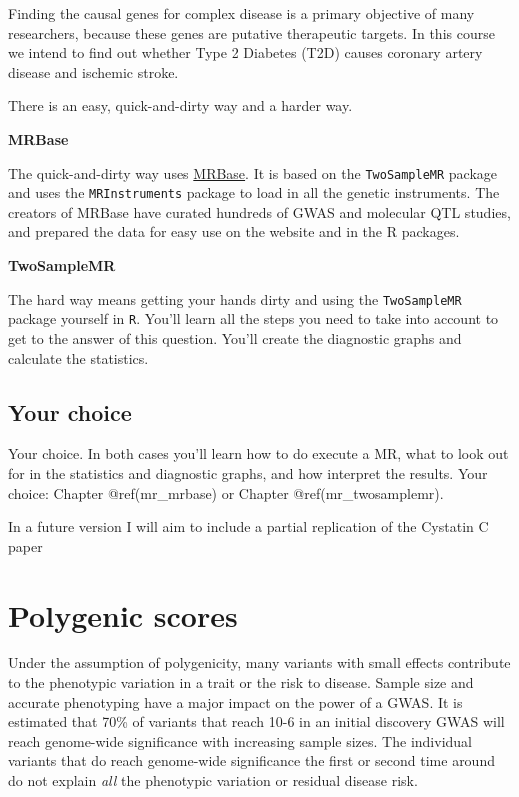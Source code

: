 \documentclass[
]{book}
\newcommand{\passthrough}[1]{#1}
\begin{document}
Finding the causal genes for complex disease is a primary objective of many researchers, because these genes are putative therapeutic targets. In this course we intend to find out whether Type 2 Diabetes (T2D) causes coronary artery disease and ischemic stroke.

There is an easy, quick-and-dirty way and a harder way.

\textbf{MRBase}

The quick-and-dirty way uses \href{http://www.mrbase.org/}{MRBase}. It is based on the \passthrough{\lstinline!TwoSampleMR!} package and uses the \passthrough{\lstinline!MRInstruments!} package to load in all the genetic instruments. The creators of MRBase have curated hundreds of GWAS and molecular QTL studies, and prepared the data for easy use on the website and in the R packages.

\textbf{TwoSampleMR}

The hard way means getting your hands dirty and using the \passthrough{\lstinline!TwoSampleMR!} package yourself in \passthrough{\lstinline!R!}. You'll learn all the steps you need to take into account to get to the answer of this question. You'll create the diagnostic graphs and calculate the statistics.

\hypertarget{your-choice}{%
\subsection{Your choice}\label{your-choice}}

Your choice. In both cases you'll learn how to do execute a MR, what to look out for in the statistics and diagnostic graphs, and how interpret the results. Your choice: Chapter @ref(mr\_mrbase) or Chapter @ref(mr\_twosamplemr).

In a future version I will aim to include a partial replication of the Cystatin C paper\citep{vanderlaan2016}

\hypertarget{polygenic-scores}{%
\section{Polygenic scores}\label{polygenic-scores}}

Under the assumption of polygenicity, many variants with small effects contribute to the phenotypic variation in a trait or the risk to disease. Sample size and accurate phenotyping have a major impact on the power of a GWAS. It is estimated that 70\% of variants that reach 10-6 in an initial discovery GWAS will reach genome-wide significance with increasing sample sizes. The individual variants that do reach genome-wide significance the first or second time around do not explain \emph{all} the phenotypic variation or residual disease risk.
\end{document}
